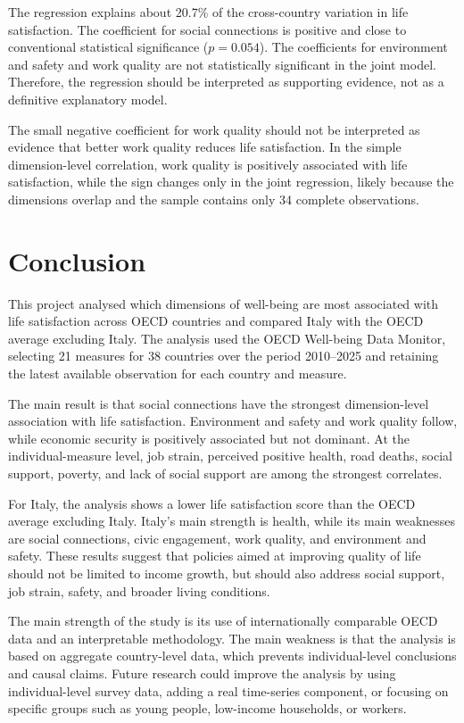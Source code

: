 \documentclass[11pt,a4paper]{article}
\begin{document}
The regression explains about 20.7\% of the cross-country variation in life satisfaction. The coefficient for social connections is positive and close to conventional statistical significance ($p=0.054$). The coefficients for environment and safety and work quality are not statistically significant in the joint model. Therefore, the regression should be interpreted as supporting evidence, not as a definitive explanatory model.

The small negative coefficient for work quality should not be interpreted as evidence that better work quality reduces life satisfaction. In the simple dimension-level correlation, work quality is positively associated with life satisfaction, while the sign changes only in the joint regression, likely because the dimensions overlap and the sample contains only 34 complete observations.
\section{Conclusion}

This project analysed which dimensions of well-being are most associated with life satisfaction across OECD countries and compared Italy with the OECD average excluding Italy. The analysis used the OECD Well-being Data Monitor, selecting 21 measures for 38 countries over the period 2010--2025 and retaining the latest available observation for each country and measure.

The main result is that social connections have the strongest dimension-level association with life satisfaction. Environment and safety and work quality follow, while economic security is positively associated but not dominant. At the individual-measure level, job strain, perceived positive health, road deaths, social support, poverty, and lack of social support are among the strongest correlates.

For Italy, the analysis shows a lower life satisfaction score than the OECD average excluding Italy. Italy's main strength is health, while its main weaknesses are social connections, civic engagement, work quality, and environment and safety. These results suggest that policies aimed at improving quality of life should not be limited to income growth, but should also address social support, job strain, safety, and broader living conditions.

The main strength of the study is its use of internationally comparable OECD data and an interpretable methodology. The main weakness is that the analysis is based on aggregate country-level data, which prevents individual-level conclusions and causal claims. Future research could improve the analysis by using individual-level survey data, adding a real time-series component, or focusing on specific groups such as young people, low-income households, or workers.
\end{document}
